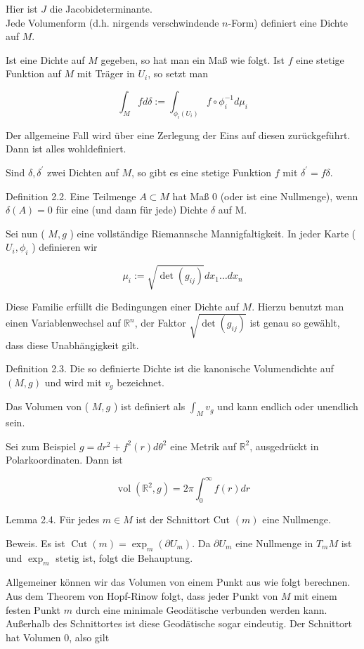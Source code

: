 \documentclass[10pt]{article}
\begin{document}
Hier ist $J$ die Jacobideterminante.\\
Jede Volumenform (d.h. nirgends verschwindende $n$-Form) definiert eine Dichte auf $M$.

Ist eine Dichte auf $M$ gegeben, so hat man ein Maß wie folgt. Ist $f$ eine stetige Funktion auf $M$ mit Träger in $U_{i}$, so setzt man

$$
\int_{M} f d \delta:=\int_{\phi_{i}\left(U_{i}\right)} f \circ \phi_{i}^{-1} d \mu_{i}
$$

Der allgemeine Fall wird über eine Zerlegung der Eins auf diesen zurückgeführt. Dann ist alles wohldefiniert.

Sind $\delta, \delta^{\prime}$ zwei Dichten auf $M$, so gibt es eine stetige Funktion $f$ mit $\delta^{\prime}=f \delta$.

Definition 2.2. Eine Teilmenge $A \subset M$ hat Maß 0 (oder ist eine Nullmenge), wenn $\delta(A)=0$ für eine (und dann für jede) Dichte $\delta$ auf M.

Sei nun ( $M, g$ ) eine vollständige Riemannsche Mannigfaltigkeit. In jeder Karte ( $U_{i}, \phi_{i}$ ) definieren wir

$$
\mu_{i}:=\sqrt{\operatorname{det}\left(g_{i j}\right)} d x_{1} \ldots d x_{n}
$$

Diese Familie erfüllt die Bedingungen einer Dichte auf $M$. Hierzu benutzt man einen Variablenwechsel auf $\mathbb{R}^{n}$, der Faktor $\sqrt{\operatorname{det}\left(g_{i j}\right)}$ ist genau so gewählt, dass diese Unabhängigkeit gilt.

Definition 2.3. Die so definierte Dichte ist die kanonische Volumendichte auf $(M, g)$ und wird mit $v_{g}$ bezeichnet.

Das Volumen von ( $M, g$ ) ist definiert als $\int_{M} v_{g}$ und kann endlich oder unendlich sein.

Sei zum Beispiel $g=d r^{2}+f^{2}(r) d \theta^{2}$ eine Metrik auf $\mathbb{R}^{2}$, ausgedrückt in Polarkoordinaten. Dann ist

$$
\operatorname{vol}\left(\mathbb{R}^{2}, g\right)=2 \pi \int_{0}^{\infty} f(r) d r
$$

Lemma 2.4. Für jedes $m \in M$ ist der Schnittort Cut $(m)$ eine Nullmenge.

Beweis. Es ist $\operatorname{Cut}(m)=\exp _{m}\left(\partial U_{m}\right)$. Da $\partial U_{m}$ eine Nullmenge in $T_{m} M$ ist und $\exp _{m}$ stetig ist, folgt die Behauptung.

Allgemeiner können wir das Volumen von einem Punkt aus wie folgt berechnen. Aus dem Theorem von Hopf-Rinow folgt, dass jeder Punkt von $M$ mit einem festen Punkt $m$ durch eine minimale Geodätische verbunden werden kann. Außerhalb des Schnittortes ist diese Geodätische sogar eindeutig. Der Schnittort hat Volumen 0, also gilt
\end{document}

